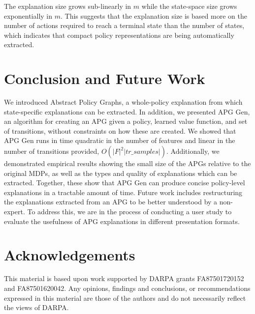\documentclass[letterpaper]{article} %
\begin{document}
\vspace{-1.67mm}
\vspace{-3.37mm}
The explanation size grows sub-linearly in $m$ while the state-space size grows exponentially in $m$.
This suggests that the explanation size is based more on the number of actions required to reach a terminal state than the number of states, which indicates that compact policy representations are being automatically extracted.

\vspace{-2.77mm}
\section{Conclusion and Future Work}
We introduced Abstract Policy Graphs, a whole-policy explanation from which state-specific explanations can be extracted. In addition, we presented APG Gen, an algorithm for creating an APG given a policy, learned value function, and set of transitions, without constraints on how these are created. We showed that APG Gen runs in time quadratic in the number of features and linear in the number of transitions provided, $O(|F|^2 |tr\_samples|)$. Additionally, we demonstrated empirical results showing the small size of the APGs relative to the original MDPs, as well as the types and quality of explanations which can be extracted. Together, these show that APG Gen can produce concise policy-level explanations in a tractable amount of time.
Future work includes restructuring the explanations extracted from an APG to be better understood by a non-expert.
To address this, we are in the process of conducting a user study to evaluate the usefulness of APG explanations in different presentation formats.

\vspace{-1.70mm}
\section{Acknowledgements}
This material is based upon work supported by DARPA grants FA87501720152 and FA87501620042. Any opinions, findings and conclusions, or recommendations expressed in this material are those of the authors and do not necessarily reflect the views of DARPA.
\end{document}
